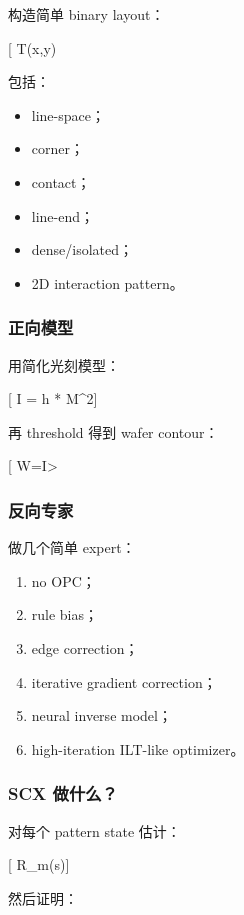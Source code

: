 \documentclass[
  12pt,
]{ctexart}
\providecommand{\tightlist}{%
  \setlength{\itemsep}{0pt}\setlength{\parskip}{0pt}}
\begin{document}
构造简单 binary layout：

{[} T(x,y)\in {0,1}{]}

包括：

\begin{itemize}
\tightlist
\item
  line-space；
\item
  corner；
\item
  contact；
\item
  line-end；
\item
  dense/isolated；
\item
  2D interaction pattern。
\end{itemize}

\subsubsection{正向模型}\label{ux6b63ux5411ux6a21ux578b}

用简化光刻模型：

{[} I = \textbar h * M\textbar\^{}2{]}

再 threshold 得到 wafer contour：

{[} W=\mathbf 1{[}I\textgreater{}\tau{]}{]}

\subsubsection{反向专家}\label{ux53cdux5411ux4e13ux5bb6}

做几个简单 expert：

\begin{enumerate}
\def\labelenumi{\arabic{enumi}.}
\tightlist
\item
  no OPC；
\item
  rule bias；
\item
  edge correction；
\item
  iterative gradient correction；
\item
  neural inverse model；
\item
  high-iteration ILT-like optimizer。
\end{enumerate}

\subsubsection{SCX 做什么？}\label{scx-ux505aux4ec0ux4e48}

对每个 pattern state 估计：

{[} R\_m(s){]}

然后证明：
\end{document}
